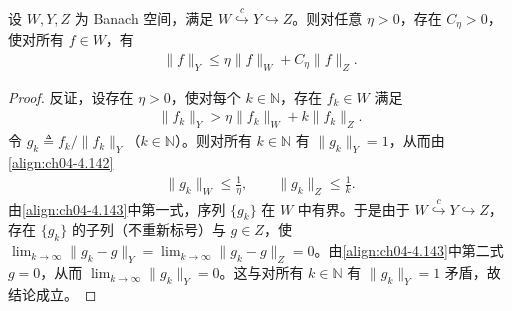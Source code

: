 \documentclass[../../main.tex]{subfiles}%
\begin{document}
\begin{lemma}\label{lemma:ch04-插值不等式}
设 $W,Y,Z$ 为 Banach 空间，满足 $W\overset{c}{\hookrightarrow}Y\hookrightarrow Z$。则对任意 $\eta>0$，存在 $C_\eta>0$，使对所有 $f\in W$，有
\begin{align}
\|f\|_Y\leqslant\eta\|f\|_W+C_\eta\|f\|_Z. \label{align:ch04-4.141}
\end{align}
\end{lemma}

\begin{proof}
反证，设存在 $\eta>0$，使对每个 $k\in\mathbb{N}$，存在 $f_k\in W$ 满足
\begin{align}
\|f_k\|_Y>\eta\|f_k\|_W+k\|f_k\|_Z. \label{align:ch04-4.142}
\end{align}
令 $g_k\triangleq f_k/\|f_k\|_Y$（$k\in\mathbb{N}$）。则对所有 $k\in\mathbb{N}$ 有 $\|g_k\|_Y=1$，从而由\eqref{align:ch04-4.142}
\begin{align}
\|g_k\|_W\leqslant\frac1\eta,\qquad \|g_k\|_Z\leqslant\frac1k. \label{align:ch04-4.143}
\end{align}
由\eqref{align:ch04-4.143}中第一式，序列 $\{g_k\}$ 在 $W$ 中有界。于是由于 $W\overset{c}{\hookrightarrow}Y\hookrightarrow Z$，存在 $\{g_k\}$ 的子列（不重新标号）与 $g\in Z$，使 $\lim_{k\to\infty}\|g_k-g\|_Y=\lim_{k\to\infty}\|g_k-g\|_Z=0$。由\eqref{align:ch04-4.143}中第二式 $g=0$，从而 $\lim_{k\to\infty}\|g_k\|_Y=0$。这与对所有 $k\in\mathbb{N}$ 有 $\|g_k\|_Y=1$ 矛盾，故结论成立。
\end{proof}
\end{document}
